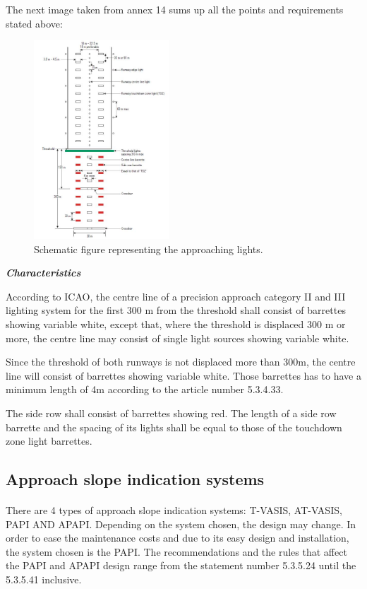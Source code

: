 		The next image taken from annex 14 sums up all the points and requirements stated above: 
		
		\begin{figure}[H]
			\centering
			\includegraphics[clip, trim=0cm 0cm 0cm 0cm, width=0.45\textwidth]{./images/Annex14/approachlights}
			\caption{Schematic figure representing the approaching lights.} %
			\label{} %
		\end{figure} 
	
		\textbf{\textit{Characteristics}}
		
		According to ICAO, the centre line of a precision approach category II and III lighting system for the first 300 m from the
		threshold shall consist of barrettes showing variable white, except that, where the threshold is displaced 300 m or more, the
		centre line may consist of single light sources showing variable white. 
		
		Since the threshold of both runways is not displaced more than 300m, the centre line will consist of barrettes showing variable white. Those barrettes has to have a minimum length of 4m according to the article number 5.3.4.33.
		
		The side row shall consist of barrettes showing red. The length of a side row barrette and the spacing of its
		lights shall be equal to those of the touchdown zone light barrettes.
		
		\subsection{Approach slope indication systems}
		\paragraph{}There are 4 types of approach slope indication systems: T-VASIS, AT-VASIS, PAPI AND APAPI. Depending on the system chosen, the design may change. In order to ease the maintenance costs and due to its easy design and installation, the system chosen is the PAPI.
		The recommendations and the rules that affect the PAPI and APAPI design range from the statement number 5.3.5.24 until the 5.3.5.41 inclusive.
		
